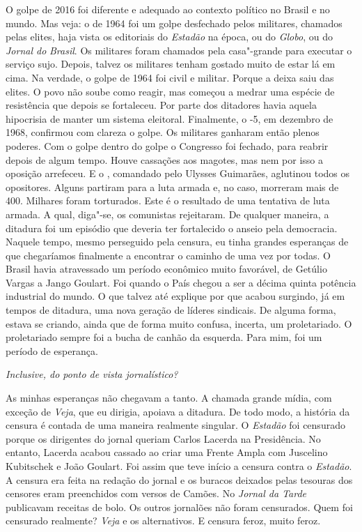 \normalfont
O golpe de 2016 foi diferente e adequado ao contexto
político no Brasil e no mundo. Mas veja: o de 1964 foi um golpe
desfechado pelos militares, chamados pelas elites, haja vista os
editoriais do \emph{Estadão} na época, ou do \emph{Globo}, ou do
\emph{Jornal do} \emph{Brasil}. Os militares foram chamados pela
casa"-grande para executar o serviço sujo. Depois, talvez os militares
tenham gostado muito de estar lá em cima. Na verdade, o golpe de 1964
foi civil e militar. Porque a deixa saiu das elites. O povo não soube
como reagir, mas começou a medrar uma espécie de resistência que depois
se fortaleceu. Por parte dos ditadores havia aquela hipocrisia de manter
um sistema eleitoral. Finalmente, o -5, em dezembro de 1968, confirmou
com clareza o golpe. Os militares ganharam então plenos poderes. Com o
golpe dentro do golpe o Congresso foi fechado, para reabrir depois de
algum tempo. Houve cassações aos magotes, mas nem por isso a oposição
arrefeceu. E o , comandado pelo Ulysses Guimarães, aglutinou todos os
opositores. Alguns partiram para a luta armada e, no caso, morreram mais
de 400. Milhares foram torturados. Este é o resultado de uma tentativa
de luta armada. A qual, diga"-se, os comunistas rejeitaram. De qualquer
maneira, a ditadura foi um episódio que deveria ter fortalecido o anseio
pela democracia. Naquele tempo, mesmo perseguido pela censura, eu tinha
grandes esperanças de que chegaríamos finalmente a encontrar o caminho
de uma vez por todas. O Brasil havia atravessado um período econômico
muito favorável, de Getúlio Vargas a Jango Goulart. Foi quando o País
chegou a ser a décima quinta potência industrial do mundo. O que talvez
até explique por que acabou surgindo, já em tempos de ditadura, uma nova
geração de líderes sindicais. De alguma forma, estava se criando, ainda
que de forma muito confusa, incerta, um proletariado. O proletariado
sempre foi a bucha de canhão da esquerda. Para mim, foi um período de
esperança.

\itshape
 Inclusive, do ponto de vista jornalístico?

\normalfont
As minhas esperanças não chegavam a tanto. A chamada
grande mídia, com exceção de \emph{Veja}, que eu dirigia, apoiava a
ditadura. De todo modo, a história da censura é contada de uma maneira
realmente singular. O \emph{Estadão} foi censurado porque os dirigentes
do jornal queriam Carlos Lacerda na Presidência. No entanto, Lacerda
acabou cassado ao criar uma Frente Ampla com Juscelino Kubitschek e João
Goulart. Foi assim que teve início a censura contra o \emph{Estadão}. A
censura era feita na redação do jornal e os buracos deixados pelas
tesouras dos censores eram preenchidos com versos de Camões. No
\emph{Jornal da Tarde} publicavam receitas de bolo. Os outros jornalões
não foram censurados. Quem foi censurado realmente? \emph{Veja} e os
alternativos. E censura feroz, muito feroz.


